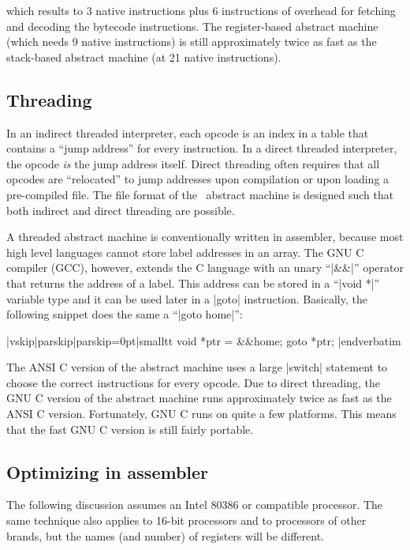 which results to 3 native instructions plus 6 instructions of overhead for
fetching and decoding the bytecode instructions. The register-based abstract
machine (which needs 9 native instructions) is still approximately twice as
fast as the stack-based abstract machine (at 21 native instructions).


\subsection{Threading}

  
In an indirect threaded interpreter, each opcode is an index in a table that
contains a ``jump address'' for every instruction. In a direct threaded
interpreter, the opcode {\it is\/} the jump address itself. Direct threading
often requires that all opcodes are ``relocated'' to jump addresses upon
compilation or upon loading a pre-compiled file. The file format of the
\Small\ abstract machine is designed such that both indirect and direct threading
are possible.

A threaded abstract machine is conventionally written in assembler, because
most high level languages cannot store label addresses in an array. The GNU C
compiler (GCC), however, extends the C language with an unary ``|&&|''
operator that returns the address of a label. This address can be stored in a
``|void *|'' variable type and it can be used later in a |goto| instruction.
Basically, the following snippet does the same a ``|goto home|'':

\verbatim|vskip|parskip|parskip=0pt|smalltt
        void *ptr = &&home;
        goto *ptr;
|endverbatim

The ANSI C version of the abstract machine uses a large |switch| statement to
choose the correct instructions for every opcode. Due to direct threading, the
GNU C version of the abstract machine runs approximately twice as fast as the
ANSI C version. Fortunately, GNU C runs on quite a few platforms. This means
that the fast GNU C version is still fairly portable.

\vfill\eject %
\subsection{Optimizing in assembler}

The following discussion assumes an Intel 80386 or compatible processor. The
same technique also applies to 16-bit processors and to processors of other
brands, but the names (and number) of registers will be different.

